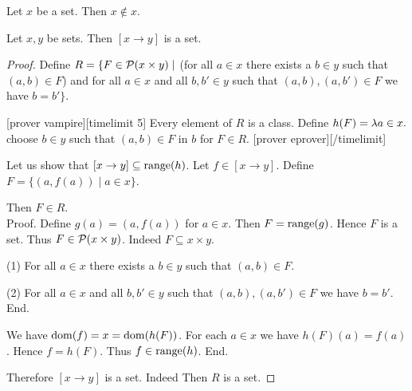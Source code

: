 \documentclass[../../set-theory/set-theory.tex]{subfiles}
\begin{document}
  \begin{forthel}
    \begin{corollary}
      Let $x$ be a set.
      Then $x \notin x$.
    \end{corollary}
  \end{forthel}

  \begin{forthel}
    \begin{proposition}
      Let $x, y$ be sets.
      Then $[x \to y]$ is a set.
    \end{proposition}
    \begin{proof}
      Define $R = \{ F \in \mathcal{P}(x \times y) \mid$ (for all $a \in x$ there
      exists a $b \in y$ such that $(a,b) \in F$) and for all $a \in x$ and
      all $b, b' \in y$ such that $(a,b), (a,b') \in F$ we have $b = b' \}$.

      [prover vampire][timelimit 5]
      Every element of $R$ is a class. %
      Define $h(F) = \mathrm{\lambda} a \in x.$ choose $b \in y$ such that
      $(a,b) \in F$ in $b$ for $F \in R$.
      [prover eprover][/timelimit]

      Let us show that $[x \to y] \subseteq \operatorname{range}(h)$.
        Let $f \in [x \to y]$.
        Define $F = \{ (a,f(a)) \mid a \in x \}$.

        Then $F \in R$. \\
        Proof.
          Define $g(a) = (a,f(a))$ for $a \in x$.
          Then $F = \operatorname{range}(g)$.
          Hence $F$ is a set.
          Thus $F \in \mathcal{P}(x \times y)$.
          Indeed $F \subseteq x \times y$.

          (1) For all $a \in x$ there exists a $b \in y$ such that $(a,b) \in F$.

          (2) For all $a \in x$ and all $b, b' \in y$ such that $(a,b),
          (a,b') \in F$ we have $b = b'$.
        End.

        We have $\operatorname{dom}(f) = x = \operatorname{dom}(h(F))$.
        For each $a \in x$ we have $h(F)(a) = f(a)$.
        Hence $f = h(F)$.
        Thus $f \in \operatorname{range}(h)$.
      End.

      Therefore $[x \to y]$ is a set.
      Indeed Then $R$ is a set.
    \end{proof}
  \end{forthel}
\end{document}
